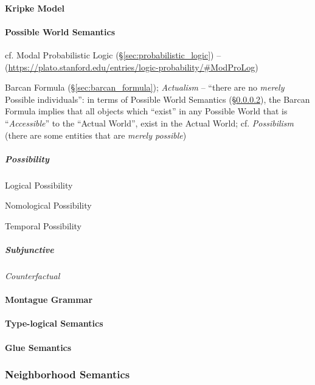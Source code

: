 \paragraph{Kripke Model}\label{sec:kripke_model}\hfill

\paragraph{Possible World Semantics}\label{sec:possible_world}\hfill

cf. Modal Probabilistic Logic (\S\ref{sec:probabilistic_logic}) --
(\url{https://plato.stanford.edu/entries/logic-probability/#ModProLog})

\fist Barcan Formula (\S\ref{sec:barcan_formula}); \emph{Actualism} -- ``there
are no \emph{merely} Possible individuals'': in terms of Possible World
Semantics (\S\ref{sec:possible_world}), the Barcan Formula implies that all
objects which ``exist'' in any Possible World that is ``\emph{Accessible}'' to
the ``Actual World'', exist in the Actual World; cf. \emph{Possibilism} (there
are some entities that are \emph{merely possible})



\subparagraph{Possibility}\label{sec:possibility}\hfill

Logical Possibility

Nomological Possibility

Temporal Possibility

\subparagraph{Subjunctive}\label{sec:subjunctive}\hfill

\emph{Counterfactual}



\paragraph{Montague Grammar}\label{sec:montague_grammar}\hfill

\paragraph{Type-logical Semantics}\label{sec:typelogical_semantics}\hfill

\paragraph{Glue Semantics}\label{sec:glue_semantics}\hfill



\subsubsection{Neighborhood Semantics}
\label{sec:neighborhood_semantics}

